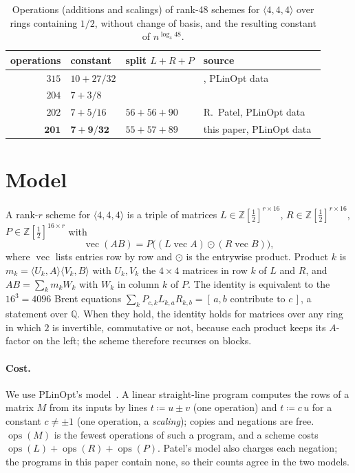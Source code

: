 \documentclass[11pt]{article}
\theoremstyle{remark}
\newcommand{\Q}{\mathbb{Q}}
\newcommand{\Z}{\mathbb{Z}}
\newcommand{\Zh}{\Z[\tfrac12]}
\newcommand{\ops}{\operatorname{ops}}
\begin{document}
\begin{table}[ht]
\centering
\caption{Operations (additions and scalings) of rank-48 schemes for
$\langle4,4,4\rangle$ over rings containing $1/2$, without change of
basis, and the resulting constant of $n^{\log_4 48}$.}\label{tab:rank48}
\begin{tabular}{rlll}
\toprule
operations & constant & split $L+R+P$ & source \\
\midrule
$315$ & $10+27/32$ & & \cite{DPS25}, PLinOpt data~\cite{PLinOpt} \\
$204$ & $7+3/8$ & & \cite{DPSST26} \\
$202$ & $7+5/16$ & $56+56+90$ & R.~Patel, PLinOpt data~\cite{PLinOpt,Patel26} \\
$\mathbf{201}$ & $\mathbf{7+9/32}$ & $55+57+89$ & this paper, PLinOpt data~\cite{PLinOpt} \\
\bottomrule
\end{tabular}
\end{table}

\section{Model}\label{sec:model}

A rank-$r$ scheme for $\langle4,4,4\rangle$ is a triple of matrices
$L\in\Zh^{r\times16}$, $R\in\Zh^{r\times16}$, $P\in\Zh^{16\times r}$
with
\[
\operatorname{vec}(AB) = P\bigl((L\operatorname{vec}A)\odot(R\operatorname{vec}B)\bigr),
\]
where $\operatorname{vec}$ lists entries row by row and $\odot$ is the
entrywise product.  Product $k$ is
$m_k=\langle U_k,A\rangle\langle V_k,B\rangle$ with $U_k,V_k$ the
$4\times4$ matrices in row $k$ of $L$ and $R$, and $AB=\sum_k m_kW_k$
with $W_k$ in column $k$ of $P$.  The identity is equivalent to the
$16^3=4096$ Brent equations
$\sum_k P_{c,k}L_{k,a}R_{k,b}=[\,a,b\text{ contribute to }c\,]$, a
statement over $\Q$.  When they hold, the identity holds for matrices
over any ring in which $2$ is invertible, commutative or not, because
each product keeps its $A$-factor on the left; the scheme therefore
recurses on blocks.

\paragraph{Cost.}  We use PLinOpt's model~\cite{PLinOpt}.  A linear
straight-line program computes the rows of a matrix $M$ from its inputs
by lines $t\coloneqq u\pm v$ (one operation) and $t\coloneqq c\,u$ for a
constant $c\ne\pm1$ (one operation, a \emph{scaling}); copies and
negations are free.  $\ops(M)$ is the fewest operations of such a
program, and a scheme costs $\ops(L)+\ops(R)+\ops(P)$.  Patel's model
also charges each negation; the programs in this paper contain none, so
their counts agree in the two models.
\end{document}
